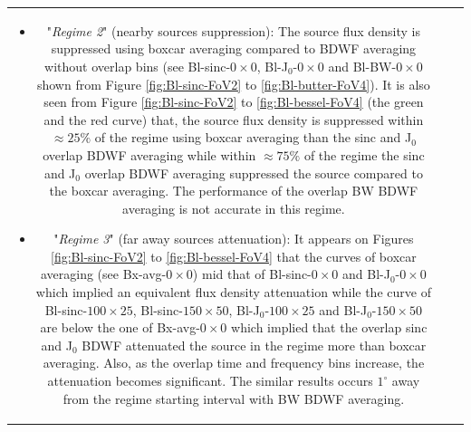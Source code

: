 \documentclass[useAMS,usenatbib]{mn2e}
\begin{document}
\begin{tabular}{*3{c}}
\begin{itemize}
\item "\textit{Regime 2}" (nearby sources suppression): The source flux density is suppressed using boxcar averaging compared to 
BDWF averaging without overlap bins (see Bl-sinc-$0\times0$, Bl-J$_0$-$0\times0$ and Bl-BW-$0\times0$ shown  from Figure 
\ref{fig:Bl-sinc-FoV2} to \ref{fig:Bl-butter-FoV4}). It is also seen from Figure \ref{fig:Bl-sinc-FoV2} to \ref{fig:Bl-bessel-FoV4} 
(the green and the red curve) that, the source flux density is suppressed within $\approx 25\%$ of the regime using boxcar 
averaging than the sinc and J$_0$ overlap BDWF averaging while within $\approx 75\%$ of the regime the sinc and J$_0$ overlap BDWF 
averaging suppressed the source compared to the boxcar averaging. The performance of the overlap BW BDWF averaging is not accurate in this 
regime.
\item "\textit{Regime 3}" (far away sources attenuation): It appears on Figures \ref{fig:Bl-sinc-FoV2} to \ref{fig:Bl-bessel-FoV4}  that  
the curves of boxcar averaging (see Bx-avg-$0\times0$) mid that of Bl-sinc-$0\times0$ and Bl-J$_0$-$0\times0$ which implied an equivalent 
flux density 
attenuation while the curve of 
Bl-sinc-$100\times25$, Bl-sinc-$150\times50$, Bl-J$_0$-$100\times25$ and Bl-J$_0$-$150\times50$ are below the one of Bx-avg-$0\times0$ which 
implied 
that the overlap sinc and J$_0$ BDWF attenuated the source in the regime more than boxcar averaging. Also, as the overlap time and frequency 
bins increase, the attenuation becomes significant. The similar results occurs $1^{\circ}$ away from the regime 
starting interval with BW BDWF averaging.
\end{itemize}
% 
% 
% 

\end{tabular}
\end{document}
